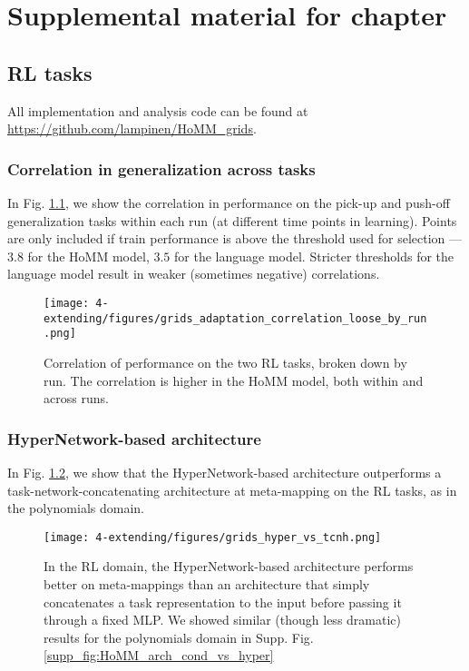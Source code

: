 \chapter{Supplemental material for chapter } \label{appendix:extending}

\section{RL tasks} \label{app:extending_grids_methods}

All implementation and analysis code can be found at \url{https://github.com/lampinen/HoMM_grids}.\par


\subsection{Correlation in generalization across tasks}
In Fig. \ref{fig:app_extending:RL_correlation_by_run}, we show the correlation in performance on the pick-up and push-off generalization tasks within each run (at different time points in learning). Points are only included if train performance is above the threshold used for selection --- \(3.8\) for the HoMM model, \(3.5\) for the language model. Stricter thresholds for the language model result in weaker (sometimes negative) correlations. \par 
\begin{figure}
\centering
\texttt{[image: 4-extending/figures/grids\_adaptation\_correlation\_loose\_by\_run.png]}
\caption[Correlation of performance on the RL tasks, by run.]{Correlation of performance on the two RL tasks, broken down by run. The correlation is higher in the HoMM model, both within and across runs.} \label{fig:app_extending:RL_correlation_by_run}
\end{figure}


\subsection{HyperNetwork-based architecture}
In Fig. \ref{supp_fig:extending:RL:arch_cond_vs_hyper}, we show that the HyperNetwork-based architecture outperforms a task-network-concatenating architecture at meta-mapping on the RL tasks, as in the polynomials domain. \par 

\begin{figure}
\centering
\texttt{[image: 4-extending/figures/grids\_hyper\_vs\_tcnh.png]}
\caption{In the RL domain, the HyperNetwork-based architecture performs better on meta-mappings than an architecture that simply concatenates a task representation to the input before passing it through a fixed MLP. We showed similar (though less dramatic) results for the polynomials domain in Supp. Fig. \ref{supp_fig:HoMM_arch_cond_vs_hyper}}\label{supp_fig:extending:RL:arch_cond_vs_hyper}
\end{figure}


